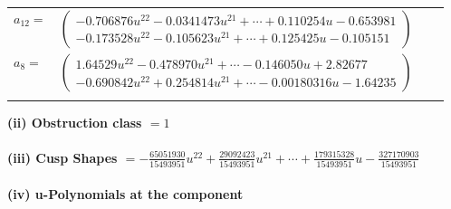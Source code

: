 \documentclass[1p]{elsarticle_modified}
\theoremstyle{definition}
\begin{document}
\begin{tabular}{m{7pt} m{180pt} m{7pt} m{180pt} }
\flushright $a_{12}=$&$\begin{pmatrix}-0.706876 u^{22}-0.0341473 u^{21}+\cdots+0.110254 u-0.653981\\-0.173528 u^{22}-0.105623 u^{21}+\cdots+0.125425 u-0.105151\end{pmatrix}$ \\
\flushright $a_{8}=$&$\begin{pmatrix}1.64529 u^{22}-0.478970 u^{21}+\cdots-0.146050 u+2.82677\\-0.690842 u^{22}+0.254814 u^{21}+\cdots-0.00180316 u-1.64235\end{pmatrix}$\\&\end{tabular}
\flushleft \textbf{(ii) Obstruction class $= 1$}\\~\\
\flushleft \textbf{(iii) Cusp Shapes $= -\frac{65051930}{15493951} u^{22}+\frac{29092423}{15493951} u^{21}+\cdots+\frac{179315328}{15493951} u-\frac{327170903}{15493951}$}\\~\\
\newpage\renewcommand{\arraystretch}{1}
\flushleft \textbf{(iv) u-Polynomials at the component}\newline \\
\end{document}
